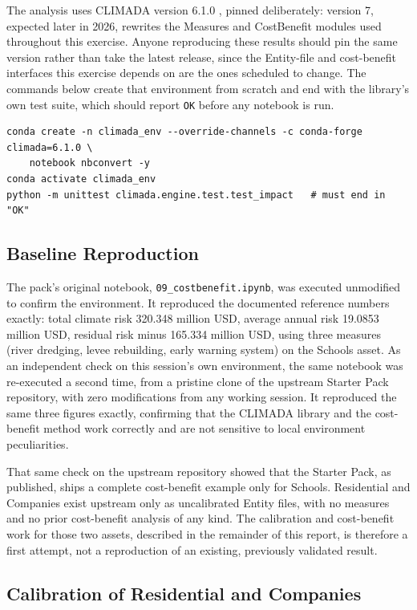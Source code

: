 \documentclass[11pt]{article}
\begin{document}
The analysis uses CLIMADA version 6.1.0 \citep{climada2026}, pinned deliberately: version 7,
expected later in 2026, rewrites the Measures and CostBenefit modules used throughout this
exercise. Anyone reproducing these results should pin the same version rather than take the
latest release, since the Entity-file and cost-benefit interfaces this exercise depends on
are the ones scheduled to change. The commands below create that environment from scratch
and end with the library's own test suite, which should report \texttt{OK} before any
notebook is run.

\begin{verbatim}
conda create -n climada_env --override-channels -c conda-forge climada=6.1.0 \
    notebook nbconvert -y
conda activate climada_env
python -m unittest climada.engine.test.test_impact   # must end in "OK"
\end{verbatim}

\subsection{Baseline Reproduction}
\label{sec:baseline}

The pack's original notebook, \texttt{09\_costbenefit.ipynb}, was executed unmodified to
confirm the environment. It reproduced the documented reference numbers exactly: total
climate risk 320.348 million USD, average annual risk 19.0853 million USD, residual risk
minus 165.334 million USD, using three measures (river dredging, levee rebuilding, early
warning system) on the Schools asset. As an independent check on this session's own
environment, the same notebook was re-executed a second time, from a pristine clone of the
upstream Starter Pack repository, with zero modifications from any working session. It
reproduced the same three figures exactly, confirming that the CLIMADA library and the
cost-benefit method work correctly and are not sensitive to local environment
peculiarities.

That same check on the upstream repository showed that the Starter Pack, as published,
ships a complete cost-benefit example only for Schools. Residential and Companies exist
upstream only as uncalibrated Entity files, with no measures and no prior cost-benefit
analysis of any kind. The calibration and cost-benefit work for those two assets, described
in the remainder of this report, is therefore a first attempt, not a reproduction of an
existing, previously validated result.

\subsection{Calibration of Residential and Companies}
\label{sec:calibration}
\end{document}
